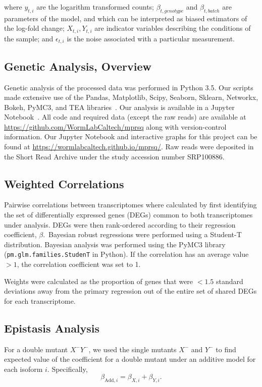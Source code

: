 \documentclass[10pt, onecolumn]{article}
\begin{document}
where $y_{t, i}$ are the logarithm transformed counts; $\beta_{t, genotype}$ and
$\beta_{t, batch}$ are parameters of the model, and which can be interpreted as
biased estimators of the log-fold change; $X_{t, i}, Y_{t, i}$ are indicator
variables describing the conditions of the sample; and $\epsilon_{t, i}$ is the
noise associated with a particular measurement.

\subsection*{Genetic Analysis, Overview}
Genetic analysis of the processed data was performed in Python 3.5. Our scripts
made extensive use of the Pandas, Matplotlib, Scipy, Seaborn, Sklearn, Networkx,
Bokeh, PyMC3, and TEA libraries~\cite{Team2014,McKinney2011,Oliphant2007,
Pedregosa2012,Salvatier2015,VanDerWalt2011,Hunter2007,Angeles-Albores2016,Waskom}.
Our analysis is available in a Jupyter Notebook~\cite{Perez2007}. All code and
required data (except the raw reads) are available at
\url{https://github.com/WormLabCaltech/mprsq} along with version-control
information. Our Jupyter Notebook and interactive graphs for this project can be
found at \url{https://wormlabcaltech.github.io/mprsq/}. Raw reads were deposited
in the Short Read Archive under the study accession number SRP100886.


\subsection*{Weighted Correlations}
Pairwise correlations between transcriptomes where calculated by first identifying
the set of differentially expressed genes (DEGs) common to both transcriptomes under
analysis. DEGs were then rank-ordered according to their regression coefficient,
$\beta$.\ Bayesian robust regressions were performed using a Student-T distribution.
Bayesian analysis was performed using the PyMC3 library~\cite{Salvatier2015}
(\texttt{pm.glm.families.StudenT} in Python). If the correlation has an average
value $>1$, the correlation coefficient was set to 1.

Weights were calculated as the proportion of genes that were $<1.5$ standard
deviations away from the primary regression out of the entire set of shared DEGs
for each transcriptome.

\subsection*{Epistasis Analysis}
For a double mutant $X^-Y^-$, we used the single mutants $X^-$ and $Y^-$ to
find expected value of the coefficient for a double mutant under an additive model
for each isoform $i$.
Specifically,
\begin{equation}
  \beta_{\mathrm{Add},i} = \beta_{X,i} + \beta_{Y,i}.
\end{equation}
\end{document}
